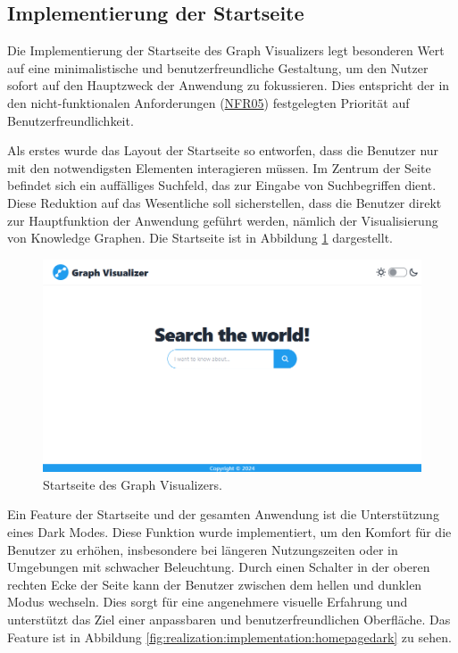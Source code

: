 \subsection{Implementierung der Startseite}

Die Implementierung der Startseite des Graph Visualizers legt besonderen Wert auf eine minimalistische und benutzerfreundliche Gestaltung, um den Nutzer sofort auf den Hauptzweck der Anwendung zu fokussieren. Dies entspricht der in den nicht-funktionalen Anforderungen (\hyperref[NFR05]{NFR05}) festgelegten Priorität auf Benutzerfreundlichkeit.

Als erstes wurde das Layout der Startseite so entworfen, dass die Benutzer nur mit den notwendigsten Elementen interagieren müssen. Im Zentrum der Seite befindet sich ein auffälliges Suchfeld, das zur Eingabe von Suchbegriffen dient. Diese Reduktion auf das Wesentliche soll sicherstellen, dass die Benutzer direkt zur Hauptfunktion der Anwendung geführt werden, nämlich der Visualisierung von Knowledge Graphen. Die Startseite ist in Abbildung \ref{fig:realization:implementation:homepage} dargestellt.

\begin{figure}[h]
    \centering
    \includegraphics[height=.5\textwidth]{images/03/HomePage.png}
    \caption{Startseite des Graph Visualizers.}
    \label{fig:realization:implementation:homepage}
\end{figure}

Ein Feature der Startseite und der gesamten Anwendung ist die Unterstützung eines Dark Modes. Diese Funktion wurde implementiert, um den Komfort für die Benutzer zu erhöhen, insbesondere bei längeren Nutzungszeiten oder in Umgebungen mit schwacher Beleuchtung. Durch einen Schalter in der oberen rechten Ecke der Seite kann der Benutzer zwischen dem hellen und dunklen Modus wechseln. Dies sorgt für eine angenehmere visuelle Erfahrung und unterstützt das Ziel einer anpassbaren und benutzerfreundlichen Oberfläche. Das Feature ist in Abbildung \ref{fig:realization:implementation:homepagedark} zu sehen.


